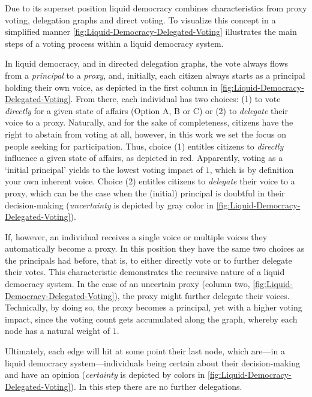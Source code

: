 Due to its superset position liquid democracy combines characteristics from proxy voting, delegation graphs and direct voting. To visualize this concept in a simplified manner \autoref{fig:Liquid-Democracy-Delegated-Voting} illustrates the main steps of a voting process within a liquid democracy system.

In liquid democracy, and in directed delegation graphs, the vote always flows from a \textit{principal} to a \textit{proxy}, and, initially, each citizen always starts as a  principal holding their own voice, as depicted in the first column in \autoref{fig:Liquid-Democracy-Delegated-Voting}. From there, each individual has two choices: (1) to vote \textit{directly} for a given state of affairs (Option A, B or C) or (2) to \textit{delegate} their voice to a proxy. Naturally, and for the sake of completeness, citizens have the right to abstain from voting at all, however, in this work we set the focus on people seeking for participation. Thus, choice (1) entitles citizens to \textit{directly} influence a given state of affairs, as depicted in red. Apparently, voting as a ‘initial principal’ yields to the lowest voting impact of \(1\), which is by definition your own inherent voice. Choice (2) entitles citizens to \textit{delegate} their voice to a proxy, which can be the case when the (initial) principal is doubtful in their decision-making (\textit{uncertainty} is depicted by gray color in \autoref{fig:Liquid-Democracy-Delegated-Voting}).

If, however, an individual receives a single voice or multiple voices they automatically become a proxy. In this position they have the same two choices as the principals had before, that is, to either directly vote or to further delegate their votes. This characteristic demonstrates the recursive nature of a liquid democracy system. In the case of an uncertain proxy (column two, \autoref{fig:Liquid-Democracy-Delegated-Voting}), the proxy might further delegate their voices. Technically, by doing so, the proxy becomes a principal, yet with a higher voting impact, since the voting count gets accumulated along the graph, whereby each node has a natural weight of \(1\).

Ultimately, each edge will hit at some point their last node, which are---in a liquid democracy system---individuals being certain about their decision-making and have an opinion (\textit{certainty} is depicted by colors in \autoref{fig:Liquid-Democracy-Delegated-Voting}). In this step there are no further delegations.

